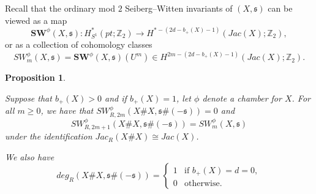 \documentclass{amsart}
\newtheorem{proposition}[theorem]{Proposition}
\theoremstyle{definition}
\theoremstyle{remark}
\numberwithin{equation}{section}
\begin{document}
Recall that the ordinary mod $2$ Seiberg--Witten invariants of $(X,\mathfrak{s})$ can be viewed as a map
\[
\mathbf{SW}^\phi(X , \mathfrak{s}) : H^*_{S^1}(pt ; \mathbb{Z}_2) \to H^{* - (2d-b_+(X)-1)}(Jac(X) ; \mathbb{Z}_2),
\]
or as a collection of cohomology classes
\[
SW^\phi_m(X,\mathfrak{s}) = \mathbf{SW}^\phi(X,\mathfrak{s})(U^m) \in H^{2m-(2d-b_+(X)-1)}(Jac(X) ; \mathbb{Z}_2).
\]

\begin{proposition}\label{prop:XX}

Suppose that $b_+(X) > 0$ and if $b_+(X) = 1$, let $\phi$ denote a chamber for $X$. For all $m \ge 0$, we have that $SW^\phi_{R,2m}(X \# X , \mathfrak{s} \# (-\mathfrak{s}) ) = 0$ and
\[
SW^\phi_{R,2m+1}(X \# X , \mathfrak{s} \# (-\mathfrak{s}) ) = SW_m^\phi(X,\mathfrak{s})
\]
under the identification $Jac_R(X \# X) \cong Jac(X)$.

We also have
\[
deg_R( X \# X , \mathfrak{s} \# (-\mathfrak{s}) ) = \begin{cases} 1 & \text{if } b_+(X) = d = 0, \\ 0 & \text{otherwise}. \end{cases}
\]

\end{proposition}
\end{document}
